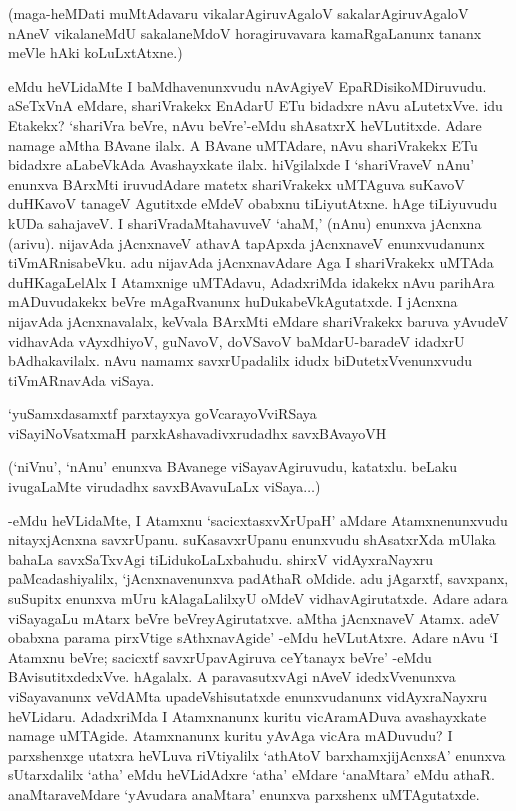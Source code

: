 (maga-heMDati muMtAdavaru vikalarAgiruvAgaloV sakalarAgiruvAgaloV nAneV vikalaneMdU sakalaneMdoV horagiruvavara kamaRgaLanunx tananx meVle hAki koLuLxtAtxne.)

eMdu heVLidaMte I baMdhavenunxvudu nAvAgiyeV EpaRDisikoMDiruvudu. aSeTxVnA eMdare, shariVrakekx EnAdarU ETu bidadxre nAvu aLutetxVve. idu Etakekx? `shariVra beVre, nAvu beVre'-eMdu shAsatxrX heVLutitxde. Adare namage aMtha BAvane ilalx. A BAvane uMTAdare, nAvu shariVrakekx ETu bidadxre aLabeVkAda Avashayxkate ilalx. hiVgilalxde I `shariVraveV nAnu' enunxva BArxMti iruvudAdare matetx shariVrakekx uMTAguva suKavoV duHKavoV tanageV Agutitxde eMdeV obabxnu tiLiyutAtxne. hAge tiLiyuvudu kUDa sahajaveV. I shariVradaMtahavuveV `ahaM,' (nAnu) enunxva jAcnxna (arivu). nijavAda jAcnxnaveV athavA tapApxda jAcnxnaveV enunxvudanunx tiVmARnisabeVku. adu nijavAda jAcnxnavAdare Aga I shariVrakekx uMTAda duHKagaLelAlx I Atamxnige uMTAdavu, AdadxriMda idakekx nAvu parihAra mADuvudakekx beVre mAgaRvanunx huDukabeVkAgutatxde. I jAcnxna nijavAda jAcnxnavalalx, keVvala BArxMti eMdare shariVrakekx baruva yAvudeV vidhavAda vAyxdhiyoV, guNavoV, doVSavoV baMdarU-baradeV idadxrU bAdhakavilalx. nAvu namamx savxrUpadalilx idudx biDutetxVvenunxvudu tiVmARnavAda viSaya.

\begin{shloka}
`yuSamxdasamxtf parxtayxya goVcarayoVviRSaya\\
viSayiNoVsatxmaH parxkAshavadivxrudadhx savxBAvayoVH
\end{shloka}

(`niVnu', `nAnu' enunxva BAvanege viSayavAgiruvudu, katatxlu. beLaku ivugaLaMte virudadhx savxBAvavuLaLx viSaya$\ldots$)

-eMdu heVLidaMte, I Atamxnu `sacicxtasxvXrUpaH' aMdare Atamxnenunxvudu nitayxjAcnxna savxrUpanu. suKasavxrUpanu enunxvudu shAsatxrXda mUlaka bahaLa savxSaTxvAgi tiLidukoLaLxbahudu. shirxV vidAyxraNayxru paMcadashiyalilx, `jAcnxnavenunxva padAthaR oMdide. adu jAgarxtf, savxpanx, suSupitx enunxva mUru kAlagaLalilxyU oMdeV vidhavAgirutatxde. Adare adara viSayagaLu mAtarx beVre beVreyAgirutatxve. aMtha jAcnxnaveV Atamx. adeV obabxna parama pirxVtige sAthxnavAgide' -eMdu heVLutAtxre. Adare nAvu `I Atamxnu beVre; sacicxtf savxrUpavAgiruva ceYtanayx beVre' -eMdu BAvisutitxdedxVve. hAgalalx. A paravasutxvAgi nAveV idedxVvenunxva viSayavanunx veVdAMta upadeVshisutatxde enunxvudanunx vidAyxraNayxru heVLidaru. AdadxriMda I Atamxnanunx kuritu vicAramADuva avashayxkate namage uMTAgide. Atamxnanunx kuritu yAvAga vicAra mADuvudu? I parxshenxge utatxra heVLuva riVtiyalilx `athAtoV barxhamxjijAcnxsA' enunxva sUtarxdalilx `atha' eMdu heVLidAdxre `atha' eMdare `anaMtara' eMdu athaR. anaMtaraveMdare `yAvudara anaMtara' enunxva parxshenx uMTAgutatxde.

